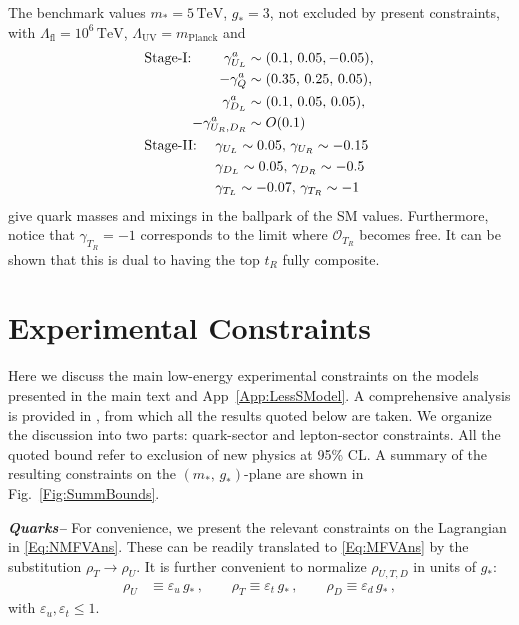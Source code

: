 \documentclass[aps,prl,twocolumn,showpacs,10pt,preprintnumbers,nofootinbib]{revtex4-2}
\newcommand{\TeV}{\,\mathrm{TeV}}
\newcommand{\gst}{g_*}
\newcommand{\mst}{m_*}
\newcommand{\eu}{\varepsilon_{u}}
\newcommand{\et}{\varepsilon_{t}}
\newcommand{\ed}{\varepsilon_{d}}
\newcommand{\Lfl}{\Lambda_{\text{fl}}}
\newcommand{\op}{\mathcal{O}}
\begin{document}
{The benchmark values $\mst= 5 \TeV$, $\gst=3$, not excluded by present constraints, with $\Lfl= 10^6 \TeV$, $\Lambda_{\text{UV}}=m_{\text{Planck}}$ and 
\begin{align}\label{Eq:BenchmarkNMFV}
&\begin{aligned}
\text{Stage-I: }\quad\quad
\gamma_{U_L}^a &\sim (0.1,\, 0.05,-0.05),\\ 
-\gamma_Q^a &\sim (0.35,\,0.25,\,0.05),\,\\
\gamma_{D_L}^a &\sim (0.1,\, 0.05,\, 0.05),\\
-\gamma_{U_R,D_R}^a &\sim O(0.1)
\end{aligned}\notag\\
&\begin{aligned}
\text{Stage-II: }\quad
&\gamma_{U_L} \sim 0.05,\,
\gamma_{U_R} \sim -0.15\\
&\gamma_{D_L} \sim 0.05,\, 
\gamma_{D_R} \sim -0.5\\
&\gamma_{T_L}\sim-0.07,\, \gamma_{T_R}\sim-1
\end{aligned}
\end{align}
give quark masses and mixings in the ballpark of the SM values. Furthermore, notice that $\gamma_{T_R} = -1$ corresponds to the limit where $\op_{T_R}$ becomes free. It can be shown \cite{Contino:2003ve} that this is dual to having the top $t_R$ fully composite.


\section{Experimental Constraints}\label{App:ExpCon}

Here we discuss the main low-energy experimental constraints on the models presented in the main text and App~\ref{App:LessSModel}. A comprehensive analysis is provided in \cite{Glioti:2024hye}, from which all the results quoted below are taken. We organize the discussion into two parts: quark-sector and lepton-sector constraints. All the quoted bound refer to exclusion of new physics at 95\% CL. A summary of the resulting constraints on the $(\mst,\,\gst)$-plane are shown in Fig.~\ref{Fig:SummBounds}.


\textit{\textbf{Quarks--}} For convenience, we present the relevant constraints on the Lagrangian in \eqref{Eq:NMFVAns}. These can be readily translated to \eqref{Eq:MFVAns} by the substitution $\rho_T \rightarrow \rho_U$. It is further convenient to normalize $\rho_{U,T,D}$ in units of $\gst$:
\begin{align}
    \rho_U &\equiv \eu\, \gst\,, \qquad
    \rho_T \equiv \et\, \gst\,, \qquad
    \rho_D \equiv \ed\, \gst\,,
\end{align}
with $\eu,\et \leq 1$.

}
\end{document}
